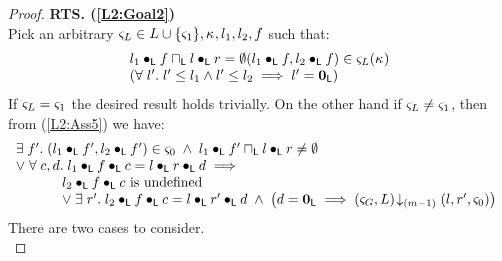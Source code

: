 \begin{lemma}[]
\begin{proof}
%
%
%
%
%
\noindent\textbf{RTS. (\ref{L2:Goal2})}\\
Pick an arbitrary $\varsigma_{L} \in L \cup \{\varsigma_{1}\}, \kappa_{}, l_1, l_2, f$ such that:
%
\begin{align}
	\begin{array}{l}
		l_1 \bullet_{\textsf{L}} f \sqcap_{\textsf{L}} l \bullet_{\textsf{L}} r = \emptyset
  	(l_1 \bullet_{\textsf{L}} f, l_2 \bullet_{\textsf{L}} f) \in \varsigma_{L}(\kappa_{}) \\
  	\left(\forall\; l'.\; l' \leq l_1 \land l' \leq l_2 \implies l' = \mathbf{0}_{\textsf{L}}\right)\\
	\end{array} \label{LIH: Ass1}
\end{align} 
%
If $\varsigma_{L} = \varsigma_{1}$ the desired result holds trivially. On the other hand if $\varsigma_{L} \not= \varsigma_{1}$, then from (\ref{L2:Ass5}) we have:
\begin{align}
	\begin{array}{l}
		\exists\; f'.\; (l_1 \bullet_{\textsf{L}} f', l_2 \bullet_{\textsf{L}} f') \in \varsigma_{0} \;\land\; l_1 \bullet_{\textsf{L}} f' \sqcap_{\textsf{L}} l \bullet_{\textsf{L}} r \not= \emptyset\\
		\lor\;\forall\; c, d.\;  l_1 \bullet_{\textsf{L}} f \bullet_{\textsf{L}} c = l \bullet_{\textsf{L}} r \bullet_{\textsf{L}} d \implies\\
		\hspace*{1cm}
		\begin{array}{l l}
			l_2 \bullet_{\textsf{L}} f \bullet_{\textsf{L}} c \text{ is undefined}\\
			\lor\; \exists\; r'.\; l_2 \bullet_{\textsf{L}} f \bullet_{\textsf{L}} c = l \bullet_{\textsf{L}} r' \bullet_{\textsf{L}} d \;\land\; \left( d = \mathbf{0}_{\textsf{L}} \implies \left(\varsigma_{G}, L\right) \!\downarrow_{(m-1)} \left(l, r', \varsigma_{0}\right)\right)
		\end{array}
	\end{array} \nonumber
\end{align}
%
There are two cases to consider.\\


\end{proof}
\end{lemma}
